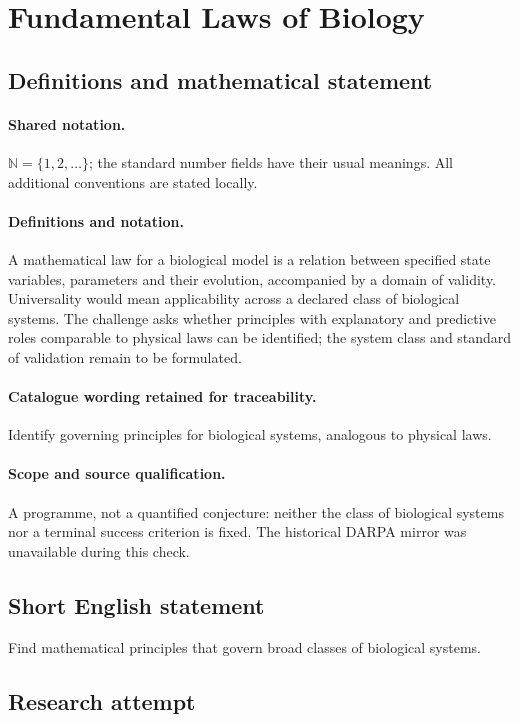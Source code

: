 \documentclass[11pt]{article}
\begin{document}
\section{Fundamental Laws of Biology}\label{statement}

\subsection{Definitions and mathematical statement}

\paragraph{Shared notation.}$\mathbb N=\{1,2,\ldots\}$; the standard number fields have their usual meanings. All additional conventions are stated locally.


\paragraph{Definitions and notation.}A mathematical law for a biological model is a relation between specified state variables, parameters and their evolution, accompanied by a domain of validity. Universality would mean applicability across a declared class of biological systems. The challenge asks whether principles with explanatory and predictive roles comparable to physical laws can be identified; the system class and standard of validation remain to be formulated.

\paragraph{Catalogue wording retained for traceability.}
Identify governing principles for biological systems, analogous to physical laws.
\paragraph{Scope and source qualification.}A programme, not a quantified conjecture: neither the class of biological systems nor a terminal success criterion is fixed. The historical DARPA mirror was unavailable during this check.
\subsection{Short English statement}
Find mathematical principles that govern broad classes of biological systems.
\subsection{Research attempt}
\end{document}
